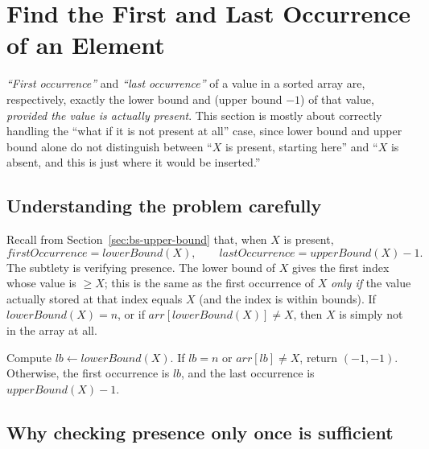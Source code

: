 \section{Find the First and Last Occurrence of an Element}
\label{sec:bs-first-last}


\begin{patternbox}
\emph{``First occurrence''} and \emph{``last occurrence''} of a value in a
sorted array are, respectively, exactly the lower bound and
(upper bound $- 1$) of that value, \emph{provided the value is actually
present}. This section is mostly about correctly handling the ``what if it
is not present at all'' case, since lower bound and upper bound alone do
not distinguish between ``$X$ is present, starting here'' and ``$X$ is
absent, and this is just where it would be inserted.''
\end{patternbox}

\subsection*{Understanding the problem carefully}

Recall from Section~\ref{sec:bs-upper-bound} that, when $X$ is present,
\[
  \textit{firstOccurrence} = \textit{lowerBound}(X), \qquad
  \textit{lastOccurrence} = \textit{upperBound}(X) - 1.
\]
The subtlety is verifying presence. The lower bound of $X$ gives the first
index whose value is $\ge X$; this is the same as the first occurrence of
$X$ \emph{only if} the value actually stored at that index equals $X$ (and
the index is within bounds). If $\textit{lowerBound}(X) = n$, or if
$\textit{arr}[\textit{lowerBound}(X)] \ne X$, then $X$ is simply not in the
array at all.

\begin{ideabox}[Approach]
Compute $\textit{lb} \gets \textit{lowerBound}(X)$. If $\textit{lb} = n$ or
$\textit{arr}[\textit{lb}] \ne X$, return $(-1,-1)$. Otherwise, the first
occurrence is $\textit{lb}$, and the last occurrence is
$\textit{upperBound}(X) - 1$.
\end{ideabox}

\subsection*{Why checking presence only once is sufficient}

